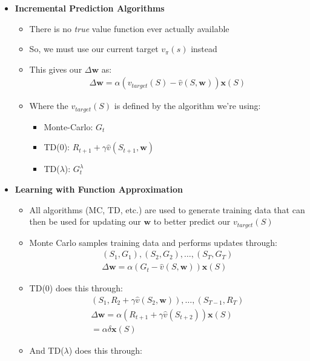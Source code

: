 \documentclass[12pt]{article}
\begin{document}
\begin{itemize}
\begin{itemize}
    \end{itemize}
    \item \textbf{Incremental Prediction Algorithms}
    \begin{itemize}
      \item There is no \textit{true} value function ever actually available
      \item So, we must use our current target $v_\pi(s)$ instead
      \item This gives our $\Delta \textbf{w}$ as:
      \begin{gather*}
        \Delta \textbf{w} = \alpha (v_{target}(S) - \hat{v}(S, \textbf{w}))\textbf{x}(S) 
      \end{gather*}
      \item Where the $v_{target}(S)$ is defined by the algorithm we're using:
      \begin{itemize}
        \item Monte-Carlo: $G_t$
        \item TD(0): $R_{t+1} + \gamma \hat{v}(S_{t+1}, \textbf{w})$
        \item TD($\lambda$): $G^\lambda_t$
      \end{itemize}
    \end{itemize}
    \item \textbf{Learning with Function Approximation}
    \begin{itemize}
      \item All algorithms (MC, TD, etc.) are used to generate training data that can then
      be used for updating our $\textbf{w}$ to better predict our $v_{target}(S)$
      \item Monte Carlo samples training data and performs updates through:
      \begin{gather*}
        (S_1, G_1), (S_2, G_2), \dots, (S_T, G_T) \\
        \Delta \textbf{w} = \alpha (G_t - \hat{v}(S, \textbf{w}))\textbf{x}(S)
      \end{gather*}
      \item TD(0) does this through:
      \begin{gather*}
        (S_1, R_2 + \gamma \hat{v}(S_2, \textbf{w})), \dots, (S_{T-1}, R_T) \\
        \Delta \textbf{w} = \alpha (R_{t+1} + \gamma \hat{v}(S_{t + 2}))\textbf{x}(S) \\
        = \alpha \delta \textbf{x}(S)
      \end{gather*}
      \item And TD($\lambda$) does this through:

\end{itemize}
\end{itemize}
\end{document}
